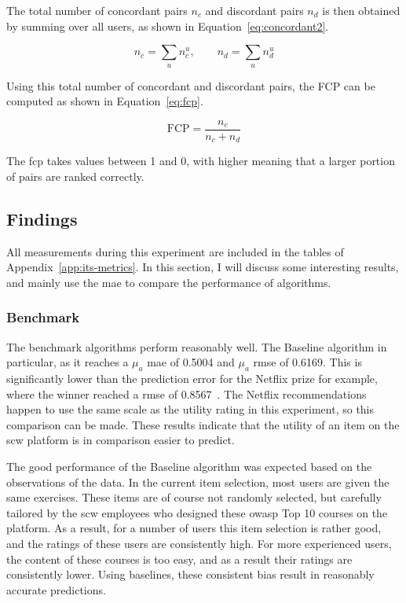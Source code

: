 The total number of concordant pairs $n_c$ and discordant pairs $n_d$ is then obtained by summing over all users, as shown in Equation~\ref{eq:concordant2}.

\begin{equation}
    \label{eq:concordant2}
    n_{c} = \sum\limits_{u} n_{c}^{u},\qquad n_{d} = \sum\limits_{u} n_{d}^{u}
\end{equation}

Using this total number of concordant and discordant pairs, the FCP can be computed as shown in Equation~\ref{eq:fcp}.

\begin{equation}
    \label{eq:fcp}
    \text{FCP} = \frac{n_{c}}{n_{c} + n_{d}}
\end{equation}

The \gls{fcp} takes values between 1 and 0, with higher meaning that a larger portion of pairs are ranked correctly.


\subsection{Findings}
All measurements during this experiment are included in the tables of Appendix~\ref{app:its-metrics}.
In this section, I will discuss some interesting results, and mainly use the \gls{mae} to compare the performance of algorithms.

\subsubsection{Benchmark}
The benchmark algorithms perform reasonably well.
The Baseline algorithm in particular, as it reaches a $\mu_a$ \gls{mae} of 0.5004 and $\mu_a$ \gls{rmse} of 0.6169.
This is significantly lower than the prediction error for the Netflix prize for example, where the winner reached a \gls{rmse} of 0.8567~\cite{zhou2008large,netflixprizeforum,netflixprizeleaderboard}. 
The Netflix recommendations happen to use the same scale as the utility rating in this experiment, so this comparison can be made.
These results indicate that the utility of an item on the \gls{scw} platform is in comparison easier to predict.

The good performance of the Baseline algorithm was expected based on the observations of the data.
In the current item selection, most users are given the same exercises.
These items are of course not randomly selected, but carefully tailored by the \gls{scw} employees who designed these \gls{owasp} Top 10 courses on the platform.
As a result, for a number of users this item selection is rather good, and the ratings of these users are consistently high.
For more experienced users, the content of these courses is too easy, and as a result their ratings are consistently lower.
Using baselines, these consistent bias result in reasonably accurate predictions.

